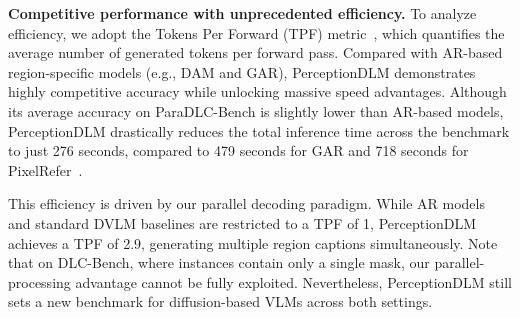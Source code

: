 \documentclass{llmxive}
\begin{document}
\noindent
\textbf{Competitive performance with unprecedented efficiency.}
To analyze efficiency, we adopt the Tokens Per Forward (TPF) metric~\citep{qian2026d3llm}, which quantifies the average number of generated tokens per forward pass. Compared with AR-based region-specific models (e.g., DAM and GAR), PerceptionDLM demonstrates highly competitive accuracy while unlocking massive speed advantages. Although its average accuracy on ParaDLC-Bench is slightly lower than AR-based models, PerceptionDLM drastically reduces the total inference time across the benchmark to just 276 seconds, compared to 479 seconds for GAR and 718 seconds for PixelRefer~\citep{yuan2025pixelrefer}. 

This efficiency is driven by our parallel decoding paradigm. While AR models and standard DVLM baselines are restricted to a TPF of 1, PerceptionDLM achieves a TPF of 2.9, generating multiple region captions simultaneously. Note that on DLC-Bench, where instances contain only a single mask, our parallel-processing advantage cannot be fully exploited. Nevertheless, PerceptionDLM still sets a new benchmark for diffusion-based VLMs across both settings.

\end{document}

